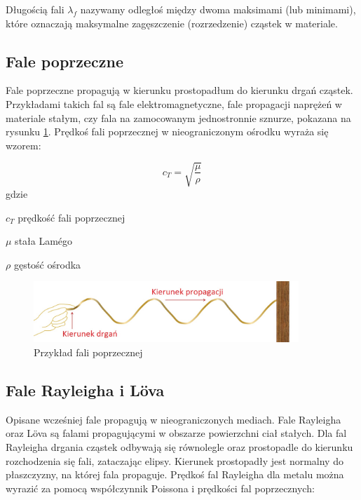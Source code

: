 Długością fali \( \lambda_f \) nazywamy odległoś między dwoma maksimami (lub minimami), które oznaczają maksymalne zagęszczenie (rozrzedzenie) cząstek w materiale.

\subsection{Fale poprzeczne}

Fale poprzeczne propagują w kierunku prostopadłum do kierunku drgań cząstek. Przykładami takich fal są fale elektromagnetyczne, fale propagacji naprężeń w materiale stałym, czy fala na zamocowanym jednostronnie sznurze, pokazana na rysunku \ref{fig:fala_poprzeczna}. Prędkoś fali poprzecznej w nieograniczonym ośrodku wyraża się wzorem:

\begin{equation}
c_T=\sqrt{\frac{\mu}{\rho}}
\end{equation}
gdzie
\begin{eqwhere}[2cm]
        \item[$c_T$] prędkość fali poprzecznej
        \item[$\mu$] stała Lam\'{e}go
        \item[$\rho$] gęstość ośrodka
\end{eqwhere}

\begin{figure}[h]
\centering
\includegraphics[width=10cm]{Zdjecia/2/fala_poprzeczna}
\caption{Przykład fali poprzecznej}
\label{fig:fala_poprzeczna}
\end{figure}

\subsection{Fale Rayleigha i L\"{o}va}

Opisane wcześniej fale propagują w nieograniczonych mediach. Fale Rayleigha oraz L\"{o}va są falami propagującymi w obszarze powierzchni ciał stałych. Dla fal Rayleigha drgania cząstek odbywają się równolegle oraz prostopadle do kierunku rozchodzenia się fali, zataczając elipsy. Kierunek prostopadły jest normalny do płaszczyzny, na której fala propaguje. Prędkoś fal Rayleigha dla metalu można wyrazić za pomocą współczynnik Poissona i prędkości fal poprzecznych:

